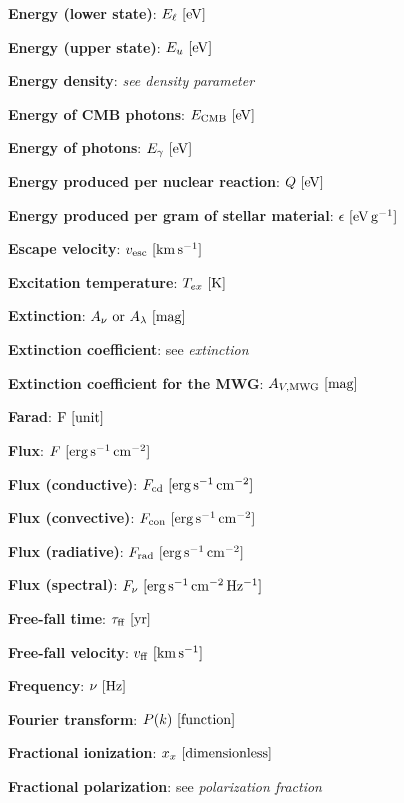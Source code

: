 \documentclass[a4paper,10pt]{article}
\begin{document}
{\noindent}\textbf{Energy (lower state)}: $E_\ell ~ [{\rm eV}]$

{\noindent}\textbf{Energy (upper state)}: $E_u ~ [{\rm eV}]$

{\noindent}\textbf{Energy density}: \textit{see density parameter}

{\noindent}\textbf{Energy of CMB photons}: $E_\mathrm{CMB} ~ [{\rm eV}]$

{\noindent}\textbf{Energy of photons}: $E_\gamma ~ [{\rm eV}]$

{\noindent}\textbf{Energy produced per nuclear reaction}: $Q ~ [{\rm eV}]$

{\noindent}\textbf{Energy produced per gram of stellar material}: $\epsilon ~ [{\rm eV\,g^{-1}}]$

{\noindent}\textbf{Escape velocity}: $v_\mathrm{esc} ~ [{\rm km\,s^{-1}}]$

{\noindent}\textbf{Excitation temperature}: $T_{ex} ~ [{\rm K}]$

{\noindent}\textbf{Extinction}: $A_\nu~{\rm or}~A_\lambda ~ [{\rm mag}]$

{\noindent}\textbf{Extinction coefficient}: see \textit{extinction}

{\noindent}\textbf{Extinction coefficient for the MWG}: $A_{V,\mathrm{MWG}} ~ [{\rm mag}]$

{\noindent}\textbf{Farad}: ${\rm F} ~ [{\rm unit}]$

{\noindent}\textbf{Flux}: $F ~ [{\rm erg\,s^{-1}\,cm^{-2}}]$

{\noindent}\textbf{Flux (conductive)}: $F_{\rm cd} ~ [{\rm erg\,s^{-1}\,cm^{-2}}]$

{\noindent}\textbf{Flux (convective)}: $F_{\rm con} ~ [{\rm erg\,s^{-1}\,cm^{-2}}]$

{\noindent}\textbf{Flux (radiative)}: $F_{\rm rad} ~ [{\rm erg\,s^{-1}\,cm^{-2}}]$

{\noindent}\textbf{Flux (spectral)}: $F_\nu ~ [{\rm erg\,s^{-1}\,cm^{-2}\,Hz^{-1}}]$

{\noindent}\textbf{Free-fall time}: $\tau_{\rm ff} ~ [{\rm yr}]$

{\noindent}\textbf{Free-fall velocity}: $v_{\rm ff} ~ [{\rm km\,s^{-1}}]$

{\noindent}\textbf{Frequency}: $\nu ~ [{\rm Hz}]$

{\noindent}\textbf{Fourier transform}: $P(k) ~ [{\rm function}]$

{\noindent}\textbf{Fractional ionization}: $x_x ~ [{\rm dimensionless}]$

{\noindent}\textbf{Fractional polarization}: see \textit{polarization fraction}
\end{document}
